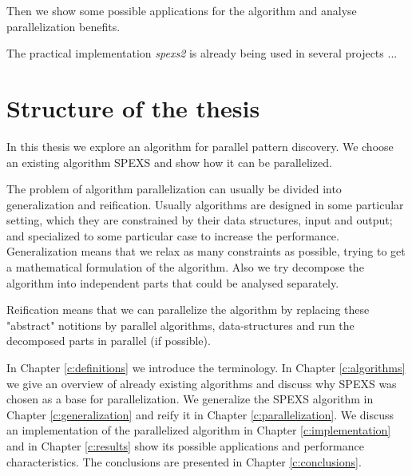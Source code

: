 Then we show some possible applications for the algorithm and analyse parallelization benefits.

The practical implementation \emph{spexs2} is already being used in several projects ... 

\section{Structure of the thesis}

In this thesis we explore an algorithm for parallel pattern discovery. We choose an existing algorithm SPEXS\cite{spexs} and show how it can be parallelized.

The problem of algorithm parallelization can usually be divided into generalization and reification. Usually algorithms are designed in some particular setting, which they are constrained by their data structures, input and output; and specialized to some particular case to increase the performance. Generalization means that we relax as many constraints as possible, trying to get a mathematical formulation of the algorithm. Also we try decompose the algorithm into independent parts that could be analysed separately.

Reification means that we can parallelize the algorithm by replacing these "abstract" notitions by parallel algorithms, data-structures and run the decomposed parts in parallel (if possible).

In Chapter \ref{c:definitions} we introduce the terminology. In Chapter \ref{c:algorithms} we give an overview of already existing algorithms and discuss why SPEXS\cite{spexs} was chosen as a base for parallelization. We generalize the SPEXS algorithm in Chapter \ref{c:generalization} and reify it in Chapter \ref{c:parallelization}. We discuss an implementation of the parallelized algorithm in Chapter \ref{c:implementation} and in Chapter \ref{c:results} show its possible applications and performance characteristics. The conclusions are presented in Chapter \ref{c:conclusions}.
